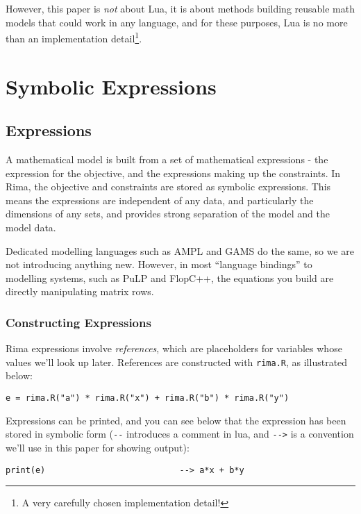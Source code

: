 \documentclass[a4paper,12pt]{article}
\begin{document}
However, this paper is \emph{not} about Lua,
it is about methods building reusable math models that could work in any language,
and for these purposes, Lua is no more than an implementation detail\footnote{A very carefully chosen implementation detail!}.



\section{Symbolic Expressions}

\subsection{Expressions}

A mathematical model is built from a set of mathematical expressions - the expression
for the objective, and the expressions making up the constraints.
In Rima, the objective and constraints are stored as symbolic expressions.
This means the expressions are independent of any data,
and particularly the dimensions of any sets,
and provides strong separation of the model and the model data.

Dedicated modelling languages such as AMPL and GAMS do the same,
so we are not introducing anything new.
However, in most ``language bindings'' to modelling systems,
such as PuLP and FlopC++,
the equations you build are directly manipulating matrix rows.

\subsubsection{Constructing Expressions}

Rima expressions involve \emph{references},
which are placeholders for variables whose values we'll look up later.
References are constructed with \lstinline!rima.R!, as illustrated below:
  \begin{lstlisting}
e = rima.R("a") * rima.R("x") + rima.R("b") * rima.R("y")
  \end{lstlisting}

Expressions can be printed, and you can see below that the expression has been stored in symbolic form
(\lstinline!--! introduces a comment in lua, and \lstinline!-->! is a convention we'll use in this paper for showing output):
  \begin{lstlisting}
print(e)                           --> a*x + b*y
  \end{lstlisting}
\end{document}
